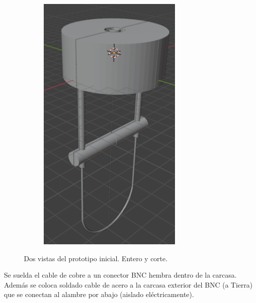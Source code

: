 \begin{figure}[!ht]
\begin{minipage}[c]{0.49\textwidth}
\begin{subfigure}{\textwidth}
			\includegraphics[width=0.76878\textwidth]{Figures/31_03_2025/Modelo_3D_2}
			\captionsetup{width=0.8\textwidth}
			\subcaption{}
		\end{subfigure}
	\end{minipage}
	\caption{Dos vistas del prototipo inicial. Entero y corte.}
	\label{fig:Modelo_3D_prototipo_inicial}
\end{figure}

Se suelda el cable de cobre a un conector BNC hembra dentro de la carcasa. Además se coloca soldado cable de acero a la carcasa exterior del BNC (a Tierra) que se conectan al alambre por abajo (aislado eléctricamente).



